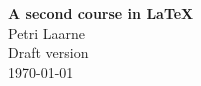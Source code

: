 \documentclass[a4paper, 11pt]{report}
\begin{document}
\begin{titlepage}

\hrulefill

\begin{flushright}
\textbf{\LARGE A second course in \LaTeX}\\[1em]
\Large Petri Laarne\\[1em]
Draft version\\
\today
\end{flushright}

\hrulefill

\end{titlepage}

\tableofcontents













\printindex
\printbibliography[heading=bibintoc]


\end{document}
